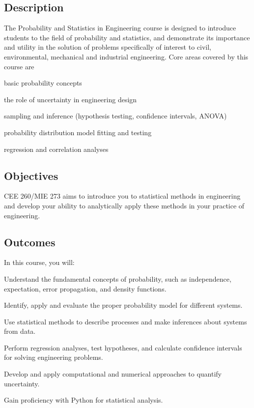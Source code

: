 \documentclass[11pt,twoside]{article}
\numberwithin{equation}{section}
\newcommand{\?}{\stackrel{?}{=}}
\begin{document}
\subsection{Description}
The Probability and Statistics in  Engineering course is designed to introduce students to
the field of probability and statistics, and demonstrate its
importance and utility in the solution of problems specifically of interest to civil,
environmental, mechanical and industrial engineering.
Core areas covered by this course are
\begin{compactitem}
\item basic probability concepts
\item the role of uncertainty in engineering design
\item sampling and inference (hypothesis testing, confidence intervals, ANOVA)
\item probability distribution model fitting and testing
\item regression and correlation analyses
\end{compactitem}

\subsection{Objectives}
CEE 260/MIE 273 aims to introduce you to statistical methods in engineering and develop
your ability to analytically apply these methods in your practice of engineering.  

\subsection{Outcomes}
In this course, you will:
\begin{compactitem}
\item   Understand the fundamental concepts of probability, such as independence, expectation,
error propagation, and density functions.
\item Identify, apply and evaluate the proper probability model for different systems.
\item Use statistical methods to describe processes and make inferences about systems from
data.
\item Perform regression analyses, test hypotheses, and calculate confidence intervals for solving
engineering problems.
\item Develop and apply computational and numerical approaches to quantify uncertainty.
\item Gain proficiency with Python for statistical analysis.
\end{compactitem}
\end{document}
